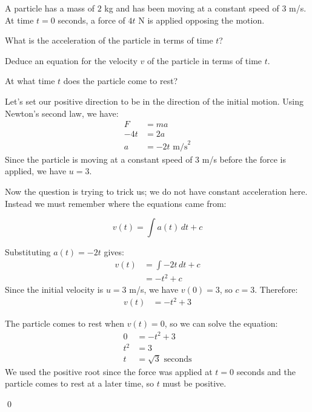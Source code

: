 \begin{example}
    A particle has a mass of $2$ kg and has been moving at a constant speed of $3$ m/s. At time $t=0$ seconds, a force of $4t$ N is applied opposing the motion.

    What is the acceleration of the particle in terms of time $t$?

    Deduce an equation for the velocity $v$ of the particle in terms of time $t$.

    At what time $t$ does the particle come to rest?
\end{example}
\begin{solution}
Let's set our positive direction to be in the direction of the initial motion. Using Newton's second law, we have:
\begin{align*}
    F &= ma \\
    -4t &= 2a \\
    a &= -2t \text{ m/s}^2
\end{align*}
Since the particle is moving at a constant speed of $3$ m/s before the force is applied, we have $u = 3$. 

Now the question is trying to trick us; we do not have constant acceleration here. Instead we must remember where the equations came from:

\[ v(t) = \int a(t) \, dt + c\]

Substituting $a(t) = -2t$ gives:
\begin{align*}
    v(t) &= \int -2t \, dt + c \\
    &= -t^2 + c
\end{align*}
Since the initial velocity is $u = 3$ m/s, we have $v(0) = 3$, so $c = 3$. Therefore:
\begin{align*}
    v(t) &= -t^2 + 3
\end{align*}

The particle comes to rest when $v(t) = 0$, so we can solve the equation:
\begin{align*}
    0 &= -t^2 + 3 \\
    t^2 &= 3 \\
    t &= \sqrt{3} \text{ seconds}
\end{align*}
We used the positive root since the force was applied at $t=0$ seconds and the particle comes to rest at a later time, so $t$ must be positive.

\qed
\end{solution}


